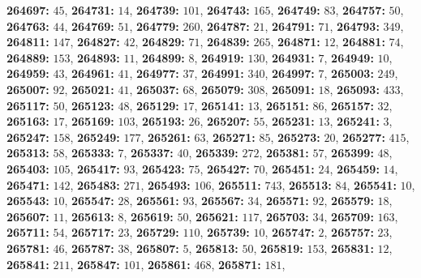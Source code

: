 \textsf{\bfseries 264697:} $45$, \textsf{\bfseries 264731:} $14$, \textsf{\bfseries 264739:} $101$, \textsf{\bfseries 264743:} $165$, \textsf{\bfseries 264749:} $83$, \textsf{\bfseries 264757:} $50$, \textsf{\bfseries 264763:} $44$, \textsf{\bfseries 264769:} $51$, \textsf{\bfseries 264779:} $260$, \textsf{\bfseries 264787:} $21$, \textsf{\bfseries 264791:} $71$, \textsf{\bfseries 264793:} $349$, \textsf{\bfseries 264811:} $147$, \textsf{\bfseries 264827:} $42$, \textsf{\bfseries 264829:} $71$, \textsf{\bfseries 264839:} $265$, \textsf{\bfseries 264871:} $12$, \textsf{\bfseries 264881:} $74$, \textsf{\bfseries 264889:} $153$, \textsf{\bfseries 264893:} $11$, \textsf{\bfseries 264899:} $8$, \textsf{\bfseries 264919:} $130$, \textsf{\bfseries 264931:} $7$, \textsf{\bfseries 264949:} $10$, \textsf{\bfseries 264959:} $43$, \textsf{\bfseries 264961:} $41$, \textsf{\bfseries 264977:} $37$, \textsf{\bfseries 264991:} $340$, \textsf{\bfseries 264997:} $7$, \textsf{\bfseries 265003:} $249$, \textsf{\bfseries 265007:} $92$, \textsf{\bfseries 265021:} $41$, \textsf{\bfseries 265037:} $68$, \textsf{\bfseries 265079:} $308$, \textsf{\bfseries 265091:} $18$, \textsf{\bfseries 265093:} $433$, \textsf{\bfseries 265117:} $50$, \textsf{\bfseries 265123:} $48$, \textsf{\bfseries 265129:} $17$, \textsf{\bfseries 265141:} $13$, \textsf{\bfseries 265151:} $86$, \textsf{\bfseries 265157:} $32$, \textsf{\bfseries 265163:} $17$, \textsf{\bfseries 265169:} $103$, \textsf{\bfseries 265193:} $26$, \textsf{\bfseries 265207:} $55$, \textsf{\bfseries 265231:} $13$, \textsf{\bfseries 265241:} $3$, \textsf{\bfseries 265247:} $158$, \textsf{\bfseries 265249:} $177$, \textsf{\bfseries 265261:} $63$, \textsf{\bfseries 265271:} $85$, \textsf{\bfseries 265273:} $20$, \textsf{\bfseries 265277:} $415$, \textsf{\bfseries 265313:} $58$, \textsf{\bfseries 265333:} $7$, \textsf{\bfseries 265337:} $40$, \textsf{\bfseries 265339:} $272$, \textsf{\bfseries 265381:} $57$, \textsf{\bfseries 265399:} $48$, \textsf{\bfseries 265403:} $105$, \textsf{\bfseries 265417:} $93$, \textsf{\bfseries 265423:} $75$, \textsf{\bfseries 265427:} $70$, \textsf{\bfseries 265451:} $24$, \textsf{\bfseries 265459:} $14$, \textsf{\bfseries 265471:} $142$, \textsf{\bfseries 265483:} $271$, \textsf{\bfseries 265493:} $106$, \textsf{\bfseries 265511:} $743$, \textsf{\bfseries 265513:} $84$, \textsf{\bfseries 265541:} $10$, \textsf{\bfseries 265543:} $10$, \textsf{\bfseries 265547:} $28$, \textsf{\bfseries 265561:} $93$, \textsf{\bfseries 265567:} $34$, \textsf{\bfseries 265571:} $92$, \textsf{\bfseries 265579:} $18$, \textsf{\bfseries 265607:} $11$, \textsf{\bfseries 265613:} $8$, \textsf{\bfseries 265619:} $50$, \textsf{\bfseries 265621:} $117$, \textsf{\bfseries 265703:} $34$, \textsf{\bfseries 265709:} $163$, \textsf{\bfseries 265711:} $54$, \textsf{\bfseries 265717:} $23$, \textsf{\bfseries 265729:} $110$, \textsf{\bfseries 265739:} $10$, \textsf{\bfseries 265747:} $2$, \textsf{\bfseries 265757:} $23$, \textsf{\bfseries 265781:} $46$, \textsf{\bfseries 265787:} $38$, \textsf{\bfseries 265807:} $5$, \textsf{\bfseries 265813:} $50$, \textsf{\bfseries 265819:} $153$, \textsf{\bfseries 265831:} $12$, \textsf{\bfseries 265841:} $211$, \textsf{\bfseries 265847:} $101$, \textsf{\bfseries 265861:} $468$, \textsf{\bfseries 265871:} $181$, 
